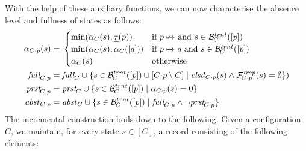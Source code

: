 \documentclass{article}
\begin{document}
%
With the help of these auxiliary functions, we can now characterise the absence level and fullness of states as follows:
%
\begin{align*}
\ALevel[\addp Cp](s) = {}
 & \begin{cases}
   \min(\ALevel[C](s),\pTLevel(p)) & \text{if } p\;{\nstepany} \text{ and } s\in \BackTrans[C]([p]) \\
   \min(\ALevel[C](s),\ALevel[C]([q])) & \text{if } p\stepany q \text{ and } s\in \BackTrans[C]([p]) \\
   \ALevel[C](s) & \text{otherwise}
   \end{cases} \\
\Full[\addp Cp] = {}
  & \Full[C] \cup \gensetof{s\in \BackTrans[C]([p])\cup [\addp Cp\setminus C]}{\Closed[\addp Cp](s) \wedge \ForwTrOp[\addp Cp](s) = \emptyset}) \\
\Present[\addp Cp] = {}
  & \Present[C] \cup \gensetof{s\in \BackTrans[C]([p])}{\ALevel[\addp Cp](s) = 0} \\
\Absent[\addp Cp] = {}
  & \Absent[C] \cup \gensetof{s\in \BackTrans[C]([p])}{\Full[\addp Cp]\wedge \neg\Present[\addp Cp]}
\end{align*}
%
The incremental construction boils down to the following. Given a configuration $C$, we maintain, for every state $s\in [C]$, a record consisting of the following elements:
%
\end{document}
